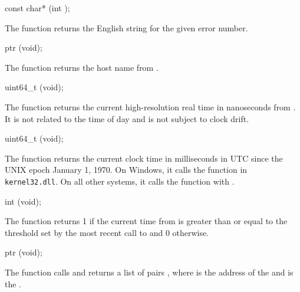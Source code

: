 \begin{function}
  const char* (int );
\end{function}

The  function returns the English string
for the given error number.

\begin{function}
  ptr (void);
\end{function}

The  function returns the host name from
.

\begin{function}
  uint64\_t (void);
\end{function}

The  function returns the current
high-resolution real time in nanoseconds from . It is
not related to the time of day and is not subject to clock drift.

\begin{function}
  uint64\_t (void);
\end{function}

The  function returns the current clock time in
milliseconds in UTC since the UNIX epoch January 1, 1970. On Windows,
it calls the  function in
\texttt{kernel32.dll}. On all other systems, it calls the
 function with .

\begin{function}
  int (void);
\end{function}

The  function returns 1 if the current time
from  is greater than or equal to the threshold set
by the most recent call to  and 0 otherwise.

\begin{function}
  ptr (void);
\end{function}

The  function calls  and
returns a list of pairs , where
 is the address of the  and 
is the .

